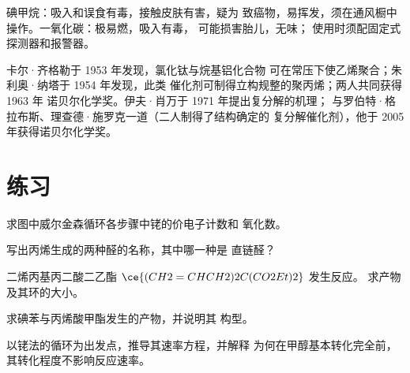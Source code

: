 \begin{safety}{}
碘甲烷：吸入和误食有毒，接触皮肤有害，疑为
致癌物，易挥发，须在通风橱中操作。一氧化碳：极易燃，吸入有毒，
可能损害胎儿，无味；
使用时须配固定式探测器和报警器。
\end{safety}

\begin{history}
卡尔·齐格勒于 1953 年发现，氯化钛与烷基铝化合物
可在常压下使乙烯聚合；朱利奥·纳塔于 1954 年发现，此类
催化剂可制得立构规整的聚丙烯；两人共同获得 1963 年
诺贝尔化学奖。伊夫·肖万于 1971 年提出复分解的机理；
与罗伯特·格拉布斯、理查德·施罗克一道（二人制得了结构确定的
复分解催化剂），他于 2005 年获得诺贝尔化学奖。
\end{history}

\section{练习}

\begin{exercise}[$\star$]\label{exo:b3:homogeneous-catalysis:1}
求图中威尔金森循环各步骤中铑的价电子计数和
氧化数。
\end{exercise}

\begin{exercise}[$\star$]\label{exo:b3:homogeneous-catalysis:2}
写出丙烯生成的两种醛的名称，其中哪一种是
直链醛？
\end{exercise}

\begin{exercise}[$\star$]\label{exo:b3:homogeneous-catalysis:3}
二烯丙基丙二酸二乙酯 $\ce{(CH2=CHCH2)2C(CO2Et)2}$ 发生反应。
求产物及其环的大小。
\end{exercise}

\begin{exercise}[$\star$]\label{exo:b3:homogeneous-catalysis:4}
求碘苯与丙烯酸甲酯发生的产物，并说明其
构型。
\end{exercise}

\begin{exercise}[$\star\star$]\label{exo:b3:homogeneous-catalysis:5}
以铑法的循环为出发点，推导其速率方程，并解释
为何在甲醇基本转化完全前，其转化程度不影响反应速率。
\end{exercise}

